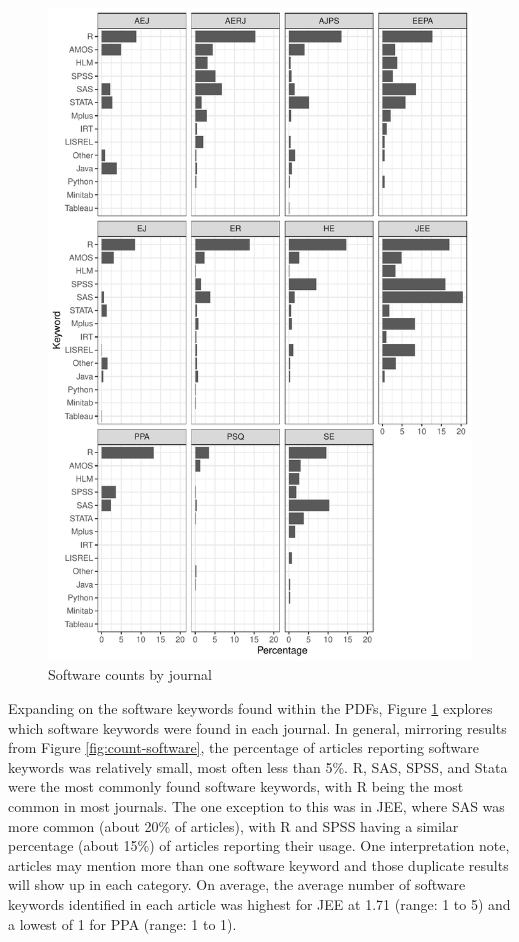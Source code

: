 \documentclass[english,,man]{apa6}
\begin{document}
\begin{figure}
\centering
\includegraphics{software_files/figure-latex/software-journal-1.pdf}
\caption{\label{fig:software-journal}Software counts by journal}
\end{figure}

Expanding on the software keywords found within the PDFs, Figure \ref{fig:software-journal} explores which software keywords were found in each journal. In general, mirroring results from Figure \ref{fig:count-software}, the percentage of articles reporting software keywords was relatively small, most often less than 5\%. R, SAS, SPSS, and Stata were the most commonly found software keywords, with R being the most common in most journals. The one exception to this was in JEE, where SAS was more common (about 20\% of articles), with R and SPSS having a similar percentage (about 15\%) of articles reporting their usage. One interpretation note, articles may mention more than one software keyword and those duplicate results will show up in each category. On average, the average number of software keywords identified in each article was highest for JEE at 1.71 (range: 1 to 5) and a lowest of 1 for PPA (range: 1 to 1).
\end{document}
